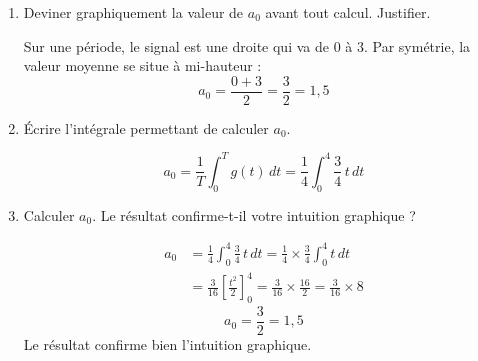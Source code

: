 \documentclass[a4paper,11pt]{article}
\begin{document}
\begin{center}
\end{center}

\begin{enumerate}[label=\textbf{\alph*)}]
  \item Deviner graphiquement la valeur de $a_0$ avant tout calcul. Justifier.
  \begin{tcolorbox}[corrigebox]
    Sur une période, le signal est une droite qui va de $0$ à $3$. Par symétrie, la valeur moyenne se situe à mi-hauteur :
    \[
      a_0 = \frac{0+3}{2} = \frac{3}{2} = 1{,}5
    \]
  \end{tcolorbox}

  \item Écrire l'intégrale permettant de calculer $a_0$.
  \begin{tcolorbox}[corrigebox]
    \[
      a_0 = \frac{1}{T}\int_0^T g(t)\,dt = \frac{1}{4}\int_0^4 \frac{3}{4}\,t\,dt
    \]
  \end{tcolorbox}

  \item Calculer $a_0$. Le résultat confirme-t-il votre intuition graphique ?
  \begin{tcolorbox}[corrigebox]
    \begin{align*}
      a_0 &= \frac{1}{4}\int_0^4 \frac{3}{4}\,t\,dt = \frac{1}{4}\times\frac{3}{4}\int_0^4 t\,dt \\
          &= \frac{3}{16}\left[\frac{t^2}{2}\right]_0^4 = \frac{3}{16}\times\frac{16}{2} = \frac{3}{16}\times 8
    \end{align*}
    \[\boxed{a_0 = \frac{3}{2} = 1{,}5}\]
    Le résultat confirme bien l'intuition graphique.
  \end{tcolorbox}
\end{enumerate}
\end{document}
